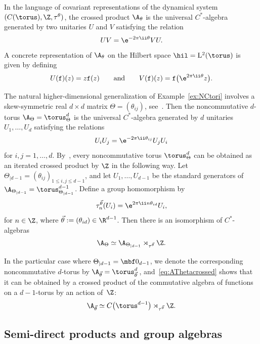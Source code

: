 \begin{Example}
In the language of covariant representations of the dynamical system
$(C(\torus),\Z,\tau^\theta)$, the crossed product $\A_\theta$ is the
universal $C^*$-algebra generated by two unitaries $U$ and $V$
satisfying the relation~\cite[Proposition~2.56]{Williams2007}
\begin{gather}\label{eq:C*UV}
U V=\e^{-2\pi\ii \theta} V U .
\end{gather}
A concrete representation
of $\A_\theta$ on the Hilbert space $\hil = {\rm L}^2(\torus)$ is
given by defining
\[
U(\mathtt{f})(z)=z \mathtt{f}(z) \qquad \mbox{and} \qquad V(\mathtt{f})(z) =
\mathtt{f}\big(\e^{2\pi\ii\theta} z\big) .
\]
\end{Example}

\begin{Example}
\label{ex:NCtorid}
The natural higher-dimensional generalization of
Example~\ref{ex:NCtori} involves a skew-symmetric real $d{\times}d$
matrix $\Theta=(\theta_{ij})$, see~\cite{Rieffel1990}. Then the noncommutative $d$-torus
$\A_\Theta=\torus_\Theta^d$ is the universal $C^*$-algebra generated
by $d$ unitaries $U_1,\dots,U_d$ satisfying the relations
\[
U_i U_j = \e^{-2\pi\ii\theta_{ij}} U_j U_i
\]
for $i,j=1,\dots,d$. By~\cite[Lemma~1.5]{Phillips2006}, every
noncommutative torus $\torus_\Theta^d$ can be obtained as an iterated
crossed product by $\Z$ in the following way. Let
$\Theta_{|d-1}=(\theta_{ij})_{1\leq i,j\leq d-1}$, and let
$U_1,\dots,U_{d-1}$ be the standard generators of
$\A_{\Theta_{|d-1}}=\torus^{d-1}_{\Theta_{|d-1}}$. Define a
group homomorphism
 by
\[
\tau_n^{\vec\theta}(U_i) = \e^{2\pi\ii n \theta_{id}} U_i
 ,
\]
for $n\in\Z$, where $\vec\theta:=(\theta_{id})\in\R^{d-1}$.
Then there is an isomorphism of $C^*$-algebras
\begin{gather}\label{eq:AThetacrossed}
\A_\Theta\simeq\A_{\Theta_{|d-1}}
\rtimes_{\tau^{\vec\theta}} \Z .
\end{gather}

In the particular case where $\Theta_{|d-1}=\mbf 0_{d-1}$, we denote the
corresponding noncommutative $d$-torus by
$\A_{\vec\theta}=\torus_{\vec\theta}^d\,$, and~\eqref{eq:AThetacrossed}
shows that it can be obtained by a crossed product of the commutative
algebra of functions on a $d{-}1$-torus by an action of~$\Z$:
\[
\A_{\vec\theta} \simeq C\big(\torus^{d-1}\big)\rtimes_{\tau^{\vec\theta}}\Z .
\]
\end{Example}

\subsection{Semi-direct products and group algebras}\label{sec:semidirect}

